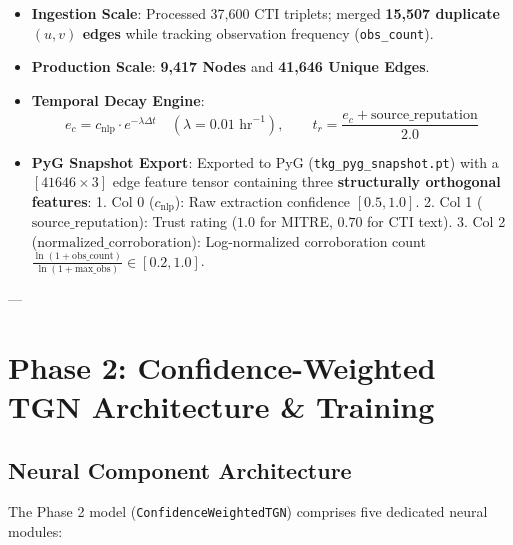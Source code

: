 \documentclass[11pt,a4paper]{article}
\begin{document}
\begin{itemize}
    \item \textbf{Ingestion Scale}: Processed 37,600 CTI triplets; merged \textbf{15,507 duplicate $(u,v)$ edges} while tracking observation frequency (\texttt{obs\_count}).
    \item \textbf{Production Scale}: \textbf{9,417 Nodes} and \textbf{41,646 Unique Edges}.
    \item \textbf{Temporal Decay Engine}:
    \begin{equation}
    e_c = c_{\text{nlp}} \cdot e^{-\lambda \Delta t} \quad (\lambda = 0.01 \text{ hr}^{-1}), \qquad t_r = \frac{e_c + \text{source\_reputation}}{2.0}
    \end{equation}
    \item \textbf{PyG Snapshot Export}: Exported to PyG (\texttt{tkg\_pyg\_snapshot.pt}) with a $[41646 \times 3]$ edge feature tensor containing three \textbf{structurally orthogonal features}:
    1. Col 0 ($c_{\text{nlp}}$): Raw extraction confidence $[0.5, 1.0]$.
    2. Col 1 ($\text{source\_reputation}$): Trust rating ($1.0$ for MITRE, $0.70$ for CTI text).
    3. Col 2 ($\text{normalized\_corroboration}$): Log-normalized corroboration count $\frac{\ln(1 + \text{obs\_count})}{\ln(1 + \text{max\_obs})} \in [0.2, 1.0]$.
\end{itemize}

---

\section{Phase 2: Confidence-Weighted TGN Architecture \& Training}

\subsection{Neural Component Architecture}
The Phase 2 model (\texttt{ConfidenceWeightedTGN}) comprises five dedicated neural modules:
\end{document}
